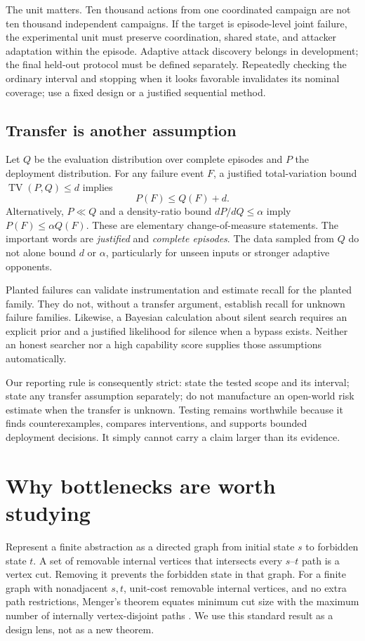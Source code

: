 \documentclass[10pt,twocolumn,letterpaper]{article}
\begin{document}
The unit matters. Ten thousand actions from one coordinated campaign are not ten thousand independent campaigns. If the target is episode-level joint failure, the experimental unit must preserve coordination, shared state, and attacker adaptation within the episode. Adaptive attack discovery belongs in development; the final held-out protocol must be defined separately. Repeatedly checking the ordinary interval and stopping when it looks favorable invalidates its nominal coverage; use a fixed design or a justified sequential method.

\subsection{Transfer is another assumption}
Let $Q$ be the evaluation distribution over complete episodes and $P$ the deployment distribution. For any failure event $F$, a justified total-variation bound $\operatorname{TV}(P,Q)\le d$ implies
\[
P(F)\le Q(F)+d.
\]
Alternatively, $P\ll Q$ and a density-ratio bound $dP/dQ\le\alpha$ imply $P(F)\le\alpha Q(F)$. These are elementary change-of-measure statements. The important words are \emph{justified} and \emph{complete episodes}. The data sampled from $Q$ do not alone bound $d$ or $\alpha$, particularly for unseen inputs or stronger adaptive opponents.

Planted failures can validate instrumentation and estimate recall for the planted family. They do not, without a transfer argument, establish recall for unknown failure families. Likewise, a Bayesian calculation about silent search requires an explicit prior and a justified likelihood for silence when a bypass exists. Neither an honest searcher nor a high capability score supplies those assumptions automatically.

Our reporting rule is consequently strict: state the tested scope and its interval; state any transfer assumption separately; do not manufacture an open-world risk estimate when the transfer is unknown. Testing remains worthwhile because it finds counterexamples, compares interventions, and supports bounded deployment decisions. It simply cannot carry a claim larger than its evidence.

\section{Why bottlenecks are worth studying}
\label{sec:graphs}

Represent a finite abstraction as a directed graph from initial state $s$ to forbidden state $t$. A set of removable internal vertices that intersects every $s$--$t$ path is a vertex cut. Removing it prevents the forbidden state in that graph. For a finite graph with nonadjacent $s,t$, unit-cost removable internal vertices, and no extra path restrictions, Menger's theorem equates minimum cut size with the maximum number of internally vertex-disjoint paths \cite{menger}. We use this standard result as a design lens, not as a new theorem.
\end{document}
